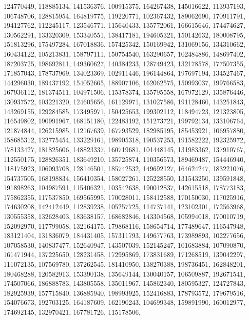 {{    124770449, 118885134, 141536376, 100915375, 164267438, 145016622,
    113937193, 106748706, 128815954, 164819775, 119220771, 102367432,
    189062690, 170911791, 194127762, 112245117, 123546771, 115640433,
    135772061, 166615646, 174474627, 130562291, 133320309, 153340551,
    138417181, 194605321, 150142632, 180008795, 151813296, 175497284,
    167018836, 157425342, 150169942, 131069156, 134310662, 160434122,
    105213831, 158797111, 150754540, 163290657, 102484886, 148697402,
    187203725, 198692811, 149360627, 140384233, 128749423, 132178578,
    177507355, 171857043, 178737969, 134023369, 102911446, 196144864,
    197697194, 134527467, 144296030, 189437192, 154052665, 188907106,
    162062575, 150993037, 199766583, 167936112, 181374511, 104971506,
    115378374, 135795558, 167972129, 135876446, 130937572, 103221320,
    124605656, 161129971, 131027586, 191128460, 143251843, 143269155,
    129284585, 173495971, 150425653, 199302112, 118494723, 121323805,
    116549802, 190991967, 168151180, 122483192, 151273721, 199792134,
    133106764, 121874844, 126215985, 112167639, 167793529, 182985195,
    185453921, 106957880, 158685312, 132775454, 133229161, 198905318,
    190537253, 191582222, 192325972, 178133427, 181825606, 148823337,
    160719681, 101448145, 131983362, 137910767, 112550175, 128826351,
    183649210, 135725874, 110356573, 189469487, 154446940, 118175923,
    106093708, 128146501, 185742532, 149692127, 164624247, 183221076,
    154737505, 168198834, 156410354, 158027261, 125228550, 131543250,
    139591848, 191898263, 104987591, 115406321, 103542638, 190012837,
    142615518, 178773183, 175862355, 117537850, 169565995, 170028011,
    158412588, 170150030, 117025916, 174630208, 142412449, 112839238,
    105257725, 114737141, 123102301, 172563968, 130555358, 132628403,
    183638157, 168682846, 143304568, 105994018, 170010719, 152092970,
    117799058, 132164175, 179868116, 158654714, 177489647, 116547948,
    183121404, 131836079, 184431405, 157311793, 149677763, 173989893,
    102277656, 107058530, 140837477, 152640947, 143507039, 152145247,
    101683884, 107090870, 161471944, 137225650, 128231458, 172995869,
    173831689, 171268519, 139042297, 111072135, 107569780, 137262545,
    181410950, 138270388, 198736451, 162848201, 180468288, 120582913,
    153390138, 135649144, 130040157, 106509887, 192671541, 174507066,
    186888783, 143805558, 135011967, 145862340, 180595327, 124727843,
    182925939, 157715840, 136885940, 198993925, 152416883, 178793572,
    179679516, 154076673, 192703125, 164187609, 162190243, 104699348,
    159891990, 160012977, 174692145, 132970421, 167781726, 115178506,
}}
